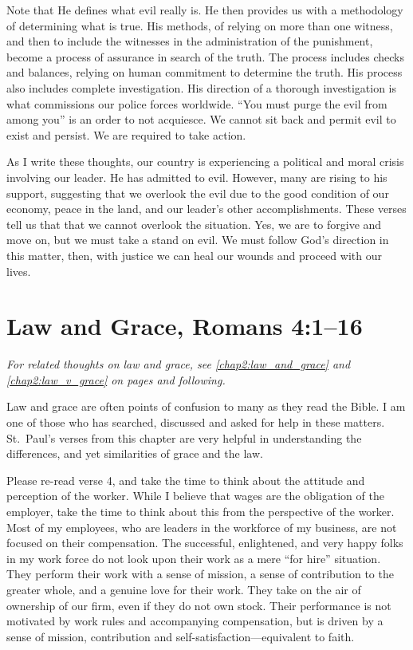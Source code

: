 \documentclass[12pt]{memoir}
\begin{document}
Note that He defines what evil really is. He then provides us
with a methodology of determining what is true. His methods, of relying
on more than one witness, and then to include the witnesses in the
administration of the punishment, become a process of assurance in
search of the truth. The process includes checks and balances, relying
on human commitment to determine the truth. His process also includes
complete investigation. His direction of a thorough investigation is what commissions our police forces worldwide. ``You must purge the evil
from among you'' is an order to not acquiesce. We cannot sit back
and permit evil to exist and persist. We are required to take action.

As I write these thoughts, our country is experiencing a political
and moral crisis involving our leader. He has admitted to evil. However,
many are rising to his support, suggesting that we overlook the evil
due to the good condition of our economy, peace in the land, and our
leader's other accomplishments. These verses tell us that that we cannot overlook the situation. Yes, we are to forgive and move on, but we
must take a stand on evil. We must follow God's direction in this
matter, then, with justice we can heal our wounds and proceed with our lives.


\section[Law and Grace]{Law and Grace, Romans 4:1--16}
\label{chap7:law_and_grace}

\begin{center}
\emph{For related thoughts on law and grace, see \ref{chap2:law_and_grace} and \ref{chap2:law_v_grace} on pages \pageref{chap2:law_and_grace} and following.}
\end{center}

Law and grace are often points of confusion to many as they read the
Bible. I am one of those who has searched, discussed and asked for
help in these matters.
St.~Paul's verses from this chapter are very helpful in understanding the differences, and yet similarities of grace and the law. 

Please re-read verse 4, and take the time to think about the attitude
and perception of the worker. While I believe that wages are the obligation
of the employer, take the time to think about this from the perspective
of the worker. Most of my employees, who are leaders in the workforce
of my business, are not focused on their compensation. The successful,
enlightened, and very happy folks in my work force do not look upon
their work as a mere ``for hire'' situation. They perform their work with a sense of mission, a sense of contribution to the greater whole, and a genuine love for their work. They take on the air of ownership
of our firm, even if they do not own stock. Their performance is not
motivated by work rules and accompanying compensation, but is driven
by a sense of mission, contribution and self-satisfaction---equivalent
to faith.
\end{document}
